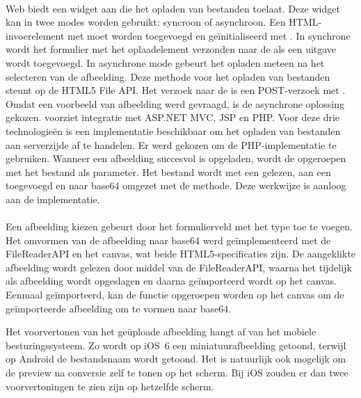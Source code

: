 \paragraph{\kendo}
\kendo{} Web biedt een widget aan die het opladen van bestanden toelaat.
Deze widget kan in twee modes worden gebruikt: syncroon of asynchroon.
Een HTML-invoerelement met  moet worden toegevoegd en geïnitialiseerd met .
In synchrone wordt het formulier met het oplaadelement verzonden naar de  als een uitgave wordt toegevoegd.
In asynchrone mode gebeurt het opladen meteen na het selecteren van de afbeelding.
Deze methode voor het opladen van bestanden steunt op de HTML5 File API.
Het verzoek naar de  is een POST-verzoek met  .
Omdat een voorbeeld van afbeelding werd gevraagd, is de asynchrone oplossing gekozen.	
\kendo{} voorziet  integratie met ASP.NET MVC,  JSP en PHP.
Voor deze drie technologieën is een implementatie beschikbaar om het opladen van bestanden aan serverzijde af te handelen.
Er werd gekozen om de PHP-implementatie te gebruiken.
Wanneer een afbeelding succesvol is opgeladen, wordt de  opgeroepen met het bestand als parameter.
Het bestand wordt met een  gelezen,  aan een  toegevoegd en naar base64 omgezet met de  methode.
Deze werkwijze is aanloog aan de \jqm{} implementatie.

\paragraph{\lungo}
Een afbeelding kiezen gebeurt door het formulierveld met het type  toe te voegen.
Het omvormen van de afbeelding naar base64 werd geïmplementeerd met de FileReaderAPI en het canvas, wat beide HTML5-specificaties zijn. 
De aangeklikte afbeelding wordt gelezen door middel van de FileReaderAPI, waarna het tijdelijk als afbeelding wordt opgeslagen en daarna geïmporteerd wordt op het canvas. 
Eenmaal geïmporteerd, kan de functie  opgeroepen worden op het canvas om de geïmporteerde afbeelding om te vormen naar base64. 

Het voorvertonen van het geüploade afbeelding hangt af van het mobiele besturingssysteem.
Zo wordt op iOS~6 een miniatuurafbeelding getoond, terwijl op Android de bestandsnaam wordt getoond.
Het is natuurlijk ook mogelijk om de preview na conversie zelf te tonen op het scherm.
Bij iOS zouden er dan twee voorvertoningen te zien zijn op hetzelfde scherm.

